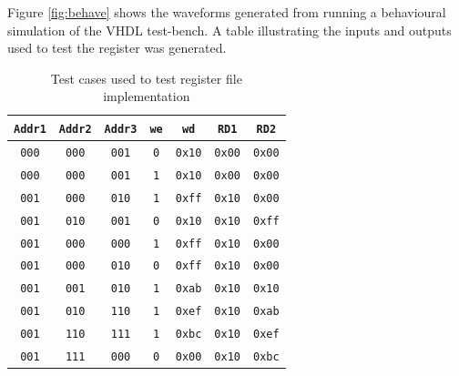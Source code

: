 \documentclass[CMPE]{../KGCOEReport}
\def\code#1{\texttt{#1}}
\begin{document}
    Figure \ref{fig:behave} shows the waveforms generated from running a behavioural simulation of the VHDL
    test-bench.
    A table illustrating the inputs and outputs used to test the register
    was generated.

    \begin{table}[H]
        \renewcommand{\arraystretch}{1.2}
        \setlength{\tabcolsep}{12pt}
        \caption{Test cases used to test register file implementation}
        \begin{center}
            \begin{tabular}{|c|c|c|c|c||c|c|}
                \hline
                \code{Addr1} & \code{Addr2} & \code{Addr3} & \code{we} & \code{wd} & \code{RD1} & \code{RD2}\\\hline
                \hline
                \code{000} & \code{000} & \code{001} & \code{0} & \code{0x10} & \code{0x00} & \code{0x00} \\\hline
                \code{000} & \code{000} & \code{001} & \code{1} & \code{0x10} & \code{0x00} & \code{0x00} \\\hline
                \code{001} & \code{000} & \code{010} & \code{1} & \code{0xff} & \code{0x10} & \code{0x00} \\\hline
                \code{001} & \code{010} & \code{001} & \code{0} & \code{0x10} & \code{0x10} & \code{0xff} \\\hline
                \code{001} & \code{000} & \code{000} & \code{1} & \code{0xff} & \code{0x10} & \code{0x00} \\\hline
                \code{001} & \code{000} & \code{010} & \code{0} & \code{0xff} & \code{0x10} & \code{0x00} \\\hline
                \code{001} & \code{001} & \code{010} & \code{1} & \code{0xab} & \code{0x10} & \code{0x10} \\\hline
                \code{001} & \code{010} & \code{110} & \code{1} & \code{0xef} & \code{0x10} & \code{0xab} \\\hline
                \code{001} & \code{110} & \code{111} & \code{1} & \code{0xbc} & \code{0x10} & \code{0xef} \\\hline
                \code{001} & \code{111} & \code{000} & \code{0} & \code{0x00} & \code{0x10} & \code{0xbc} \\\hline
            \end{tabular}
        \end{center}
        \label{tab:testcases}
    \end{table}
\end{document}
